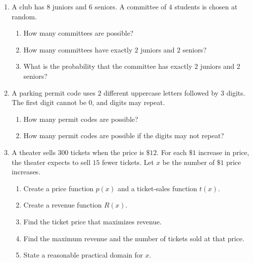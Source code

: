\documentclass[12pt]{article}
\begin{document}
\begin{enumerate}[leftmargin=*, itemsep=1.15em, topsep=0.8em]
  \item A club has $8$ juniors and $6$ seniors. A committee of $4$ students is chosen at random.
  \begin{enumerate}[label=(\alph*)]
    \item How many committees are possible?
    \item How many committees have exactly $2$ juniors and $2$ seniors?
    \item What is the probability that the committee has exactly $2$ juniors and $2$ seniors?
  \end{enumerate}

  \item A parking permit code uses $2$ different uppercase letters followed by $3$ digits. The first digit cannot be $0$, and digits may repeat.
  \begin{enumerate}[label=(\alph*)]
    \item How many permit codes are possible?
    \item How many permit codes are possible if the digits may not repeat?
  \end{enumerate}

  \item A theater sells $300$ tickets when the price is $\$12$. For each $\$1$ increase in price, the theater expects to sell $15$ fewer tickets. Let $x$ be the number of $\$1$ price increases.
  \begin{enumerate}[label=(\alph*)]
    \item Create a price function $p(x)$ and a ticket-sales function $t(x)$.
    \item Create a revenue function $R(x)$.
    \item Find the ticket price that maximizes revenue.
    \item Find the maximum revenue and the number of tickets sold at that price.
    \item State a reasonable practical domain for $x$.
  \end{enumerate}
\end{enumerate}
\end{document}
